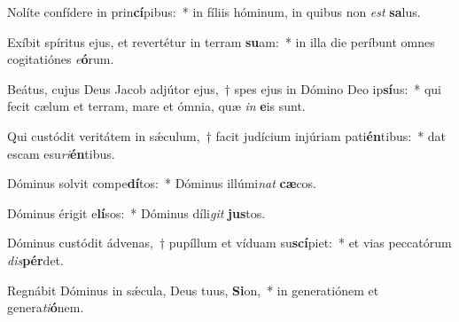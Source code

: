 \item Nolíte confídere in prin\textbf{cí}pibus:~* in fíliis hóminum, in quibus non \textit{est} \textbf{sa}lus.
\item Exíbit spíritus ejus, et revertétur in terram \textbf{su}am:~* in illa die períbunt omnes cogitatiónes \textit{e}\textbf{ó}rum.
\item Beátus, cujus Deus Jacob adjútor ejus,~† spes ejus in Dómino Deo ip\textbf{sí}us:~* qui fecit cælum et terram, mare et ómnia, quæ \textit{in} \textbf{e}is sunt.
\item Qui custódit veritátem in sǽculum,~† facit judícium injúriam pati\textbf{én}tibus:~* dat escam esu\textit{ri}\textbf{én}tibus.
\item Dóminus solvit compe\textbf{dí}tos:~* Dóminus illúmi\textit{nat} \textbf{cæ}cos.
\item Dóminus érigit e\textbf{lí}sos:~* Dóminus díli\textit{git} \textbf{jus}tos.
\item Dóminus custódit ádvenas,~† pupíllum et víduam su\textbf{scí}piet:~* et vias peccatórum \textit{dis}\textbf{pér}det.
\item Regnábit Dóminus in sǽcula, Deus tuus, \textbf{Si}on,~* in generatiónem et genera\textit{ti}\textbf{ó}nem.
